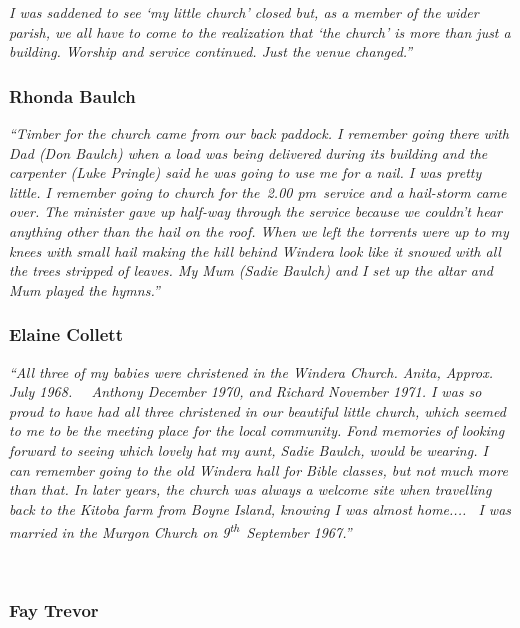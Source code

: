 \emph{I was saddened to see `my little church' closed but, as a member of the wider parish, we all have to come to the realization that `the church' is more than just a building. Worship and service continued. Just the venue changed.''}



\subsubsection{Rhonda Baulch}



\emph{``Timber for the church came from our back paddock. I remember going there with Dad (Don Baulch) when a load was being delivered during its building and the carpenter (Luke Pringle) said he was going to use me for a nail. I was pretty little. I remember going to church for the~2.00 pm~service and a hail-storm came over. The minister gave up half-way through the service because we couldn't hear anything other than the hail on the roof. When we left the torrents were up to my knees with small hail making the hill behind Windera look like it snowed with all the trees stripped of leaves. My Mum (Sadie Baulch) and I set up the altar and Mum played the hymns.''}



\subsubsection{Elaine Collett}



\emph{``All three of my babies were christened in the Windera Church. Anita, Approx. July 1968.~~ Anthony December 1970, and Richard November 1971. I was so proud to have had all three christened in our beautiful little church, which seemed to me to be the meeting place for the local community. Fond memories of looking forward to seeing which lovely hat my aunt, Sadie Baulch, would be wearing. I can remember going to the old Windera hall for Bible classes, but not much more than that. In later years, the church was always a welcome site when travelling back to the Kitoba farm from Boyne Island, knowing I was almost home.... ~I was married in the Murgon Church on 9\textsuperscript{th}~September 1967.''}



~



\subsubsection{Fay Trevor}



